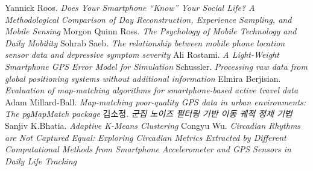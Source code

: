 \documentclass{oblivoir}
\begin{document}
  \begin{thebibliography}{9}
    Yannick Roos.
    \textit{Does Your Smartphone “Know” Your Social Life? A Methodological Comparison of Day Reconstruction, Experience Sampling, and Mobile Sensing}
    Morgon Quinn Ross.
    \textit{The Psychology of Mobile Technology and Daily Mobility}
    Sohrab Saeb.
    \textit{The relationship between mobile phone location sensor data and depressive symptom severity}
    Ali Rostami.
    \textit{A Light-Weight Smartphone GPS Error Model for Simulation}
    Schussler.
    \textit{Processing raw data from global positioning systems without additional information}
    Elmira Berjisian.
    \textit{Evaluation of map-matching algorithms for smartphone-based active travel data}
    Adam Millard-Ball.
    \textit{Map-matching poor-quality GPS data in urban environments: The pgMapMatch package}
    김소정.
    \textit{군집 노이즈 필터링 기반 이동 궤적 정제 기법}
    Sanjiv K.Bhatia.
    \textit{Adaptive K-Means Clustering}
    Congyu Wu.
    \textit{Circadian Rhythms are Not Captured Equal: Exploring Circadian Metrics Extracted by Different Computational Methods from Smartphone Accelerometer and GPS Sensors in Daily Life Tracking}
  \end{thebibliography}
\end{document}
